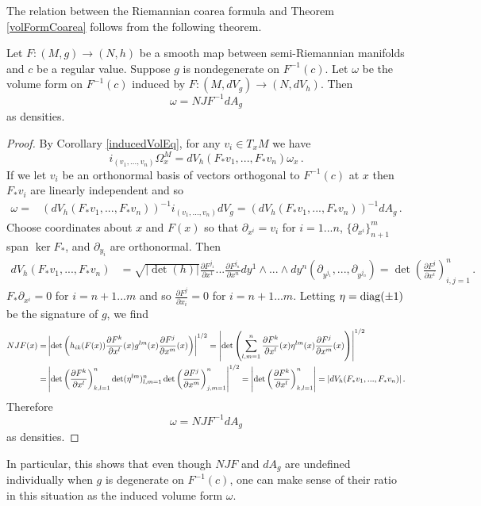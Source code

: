 The relation between the Riemannian coarea formula and Theorem \ref{volFormCoarea} follows from the following theorem.
\begin{theorem}
Let $F:(M,g)\rightarrow (N,h)$ be a smooth map between semi-Riemannian manifolds and $c$ be a regular value. Suppose $g$ is nondegenerate on $F^{-1}(c)$. Let $\omega$ be the volume form on $F^{-1}(c)$ induced by $F:(M,dV_g)\rightarrow (N,dV_h)$. Then
\begin{equation}
\omega=NJF^{-1}dA_g
\end{equation}
as densities.
\end{theorem}
\begin{proof}
By Corollary \ref{inducedVolEq}, for any $v_i\in T_xM$ we have
\begin{equation}
i_{(v_1,...,v_n)}\Omega^M_x=dV_h(F_*v_1,...,F_*v_n)\omega_x\,.
\end{equation}
If we let $v_i$ be an orthonormal basis of vectors orthogonal to $F^{-1}(c)$ at $x$ then $F_*v_i$ are linearly independent and so
\begin{align}
\omega=&(dV_h(F_*v_1,...,F_*v_n))^{-1}i_{(v_1,...,v_n)}dV_g=(dV_h(F_*v_1,...,F_*v_n))^{-1}dA_g\,.
\end{align}
Choose coordinates about $x$ and $F(x)$ so that $\partial_{x^i}=v_i$ for $i=1...n$, $\{\partial_{x^i}\}_{n+1}^m$ span $\ker F_*$, and $\partial_{y_i}$ are orthonormal. Then 
\begin{align}
dV_h(F_*v_1,...,F_*v_n)&=\sqrt{|\det(h)|}\frac{\partial F^{j_1}}{\partial x^1}...\frac{\partial F^{j_n}}{\partial x^n}dy^1\wedge...\wedge dy^n(\partial_{y^{j_1}},...,\partial_{y^{j_n}})=\det\left(\frac{\partial F^{j}}{\partial x^i}\right)_{i,j=1}^n\,.
\end{align}
$F_*\partial_{x^i}=0$ for $i=n+1...m$ and so $\frac{\partial F^j}{\partial x_i}=0$ for $i=n+1...m$. Letting $\eta=\mathrm{diag}(\pm 1)$ be the signature of $g$, we find
\begin{align}
NJF(x)=&\left|\det\left(h_{ik}(F(x))\frac{\partial F^k}{\partial x^l}(x)g^{lm}(x)\frac{\partial F^j}{\partial x^m}(x)\right)\right|^{1/2}=\left|\det\left(\sum_{l,m=1}^n\frac{\partial F^k}{\partial x^l}(x)\eta^{lm}(x)\frac{\partial F^j}{\partial x^m}(x)\right)\right|^{1/2}\notag\\
=&\left|\det\left(\frac{\partial F^k}{\partial x^l}\right)_{k,l=1}^n\det(\eta^{lm})_{l,m=1}^n\det\left(\frac{\partial F^j}{\partial x^m}\right)_{j,m=1}^n\right|^{1/2}=\left|\det\left(\frac{\partial F^k}{\partial x^l}\right)_{k,l=1}^n\right|=|dV_h(F_*v_1,...,F_*v_n)|\,.
\end{align}
Therefore 
\begin{equation}
\omega=NJF^{-1}dA_g
\end{equation}
as densities.
\end{proof}
In particular, this shows that even though $NJF$ and $dA_g$ are undefined individually when $g$ is degenerate on $F^{-1}(c)$, one can make sense of their ratio in this situation as the induced volume form $\omega$.

